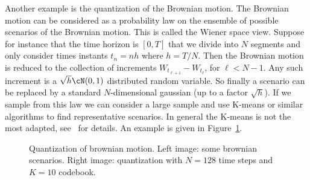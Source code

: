 \begin{example}
Another example is the quantization of the Brownian motion. The Brownian
motion can be considered as a probability law on the ensemble of possible
scenarios of the Brownian motion. This is called the Wiener space view. Suppose
for instance that the time horizon is $[0, T]$ that we divide into $N$
segments and only consider times instants $t_n = nh$ where $h = T/N$. Then
the Brownian motion is reduced to the collection of increments
$W_{t_{\ell+1}} - W_{t_\ell}$, for $\ell < N - 1$. Any such increment is a
$\sqrt{h} \cN(0, 1)$ distributed random variable. So finally a scenario can
be replaced by a standard $N$-dimensional gaussian (up to a factor $\sqrt{h}$).
If we sample from this law we can consider a large sample and use K-means or
similar algorithms to find representative scenarios. In general the K-means
is not the most adapted, see~\cite{turinici23} for details. An example is
given in Figure~\ref{fig:ch8-brownian}.
\end{example}

\begin{figure}[h]\centering
\caption{Quantization of brownian motion. Left image: some brownian scenarios.
Right image: quantization with $N = 128$ time steps and $K = 10$ codebook.}
\label{fig:ch8-brownian}
\end{figure}
